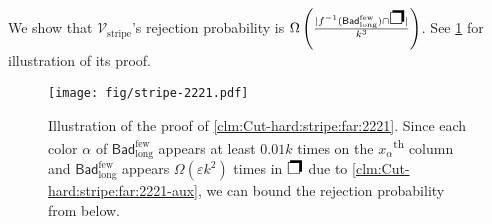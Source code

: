\documentclass[11pt,fleqn]{article}
\renewcommand{\epsilon}{\varepsilon}
\newcommand{\nth}[1]{#1\textsuperscript{th}\xspace}
\newcommand{\V}{\calV}
\newcommand{\f}{f}
\newcommand{\Vstripe}{\V_\mathrm{stripe}}
\newcommand{\Bad}{\mathsf{Bad}}
\newcommand{\Badlss}{\Bad^\mathrm{few}}
\newcommand{\BadlssL}{\Badlss_\mathrm{long}}
\newcommand{\SQ}{\text{{\Large\ding{112}}}}
\newcommand{\calV}{\mathcal{V}}
\theoremstyle{definition}
\numberwithin{equation}{section}
\begin{document}
We show that $\Vstripe$'s rejection probability is
$\Omega\left(\frac{|\f^{-1}(\BadlssL) \cap \SQ|}{k^3}\right)$.
See \cref{fig:Cut-hard:stripe:far:2221} for illustration of its proof.


\begin{figure}
    \centering
    \texttt{[image: fig/stripe-2221.pdf]}
    \caption{
        Illustration of the proof of \cref{clm:Cut-hard:stripe:far:2221}.
        Since each color $\alpha$ of $\BadlssL$ appears at least $0.01k$ times on the \nth{$x_\alpha$} column and
        $\BadlssL$ appears $\Omega(\epsilon k^2)$ times in $\SQ$
        due to \cref{clm:Cut-hard:stripe:far:2221-aux},
        we can bound the rejection probability from below.
    }
    \label{fig:Cut-hard:stripe:far:2221}
\end{figure}
\end{document}
